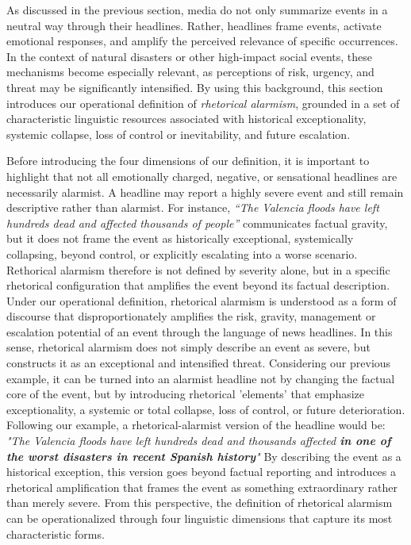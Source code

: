 As discussed in the previous section, media do not only summarize events in a neutral way through their headlines. Rather, headlines frame events,
activate emotional responses, and amplify the perceived relevance of specific occurrences. In the context of natural disasters or other
high-impact social events, these mechanisms become especially relevant, as perceptions of risk, urgency, and threat may be significantly intensified. 
By using this background, this section introduces our operational definition of \emph{rhetorical alarmism}, grounded in a set of 
characteristic linguistic resources associated with historical exceptionality, systemic collapse, loss of control or inevitability, and future escalation.

Before introducing the four dimensions of our definition, it is important to highlight that not all emotionally charged, negative, or sensational headlines 
are necessarily alarmist. A headline may report a highly severe event and still remain descriptive rather than alarmist. 
For instance, \emph{“The Valencia floods have left hundreds dead and affected thousands of people”} communicates factual gravity, but it 
does not frame the event as historically exceptional, systemically collapsing, beyond control, or explicitly escalating into a worse scenario. 
Rethorical alarmism therefore is not defined by severity alone, but in a specific rhetorical configuration that amplifies the event beyond its factual description. 
Under our operational definition, rhetorical alarmism is understood as a form of discourse that disproportionately amplifies the risk, gravity, management or escalation 
potential of an event through the language of news headlines. In this sense, rhetorical alarmism does not simply describe an event as severe, but constructs
it as an exceptional and intensified threat. Considering our previous example, it can be turned into an alarmist headline not by changing the factual core of the event, 
but by introducing rhetorical 'elements' that emphasize exceptionality, a systemic or total collapse, loss of control, or future deterioration. Following our example, 
a rhetorical-alarmist version of the headline would be: \emph{"The Valencia floods have left hundreds dead and thousands affected \textbf{in one of the worst disasters in recent Spanish history}"}
By describing the event as a historical exception, this version goes beyond factual reporting and introduces a rhetorical amplification that frames the event as 
something extraordinary rather than merely severe. From this perspective, the definition of rhetorical alarmism can be operationalized 
through four linguistic dimensions that capture its most characteristic forms. 
\\

